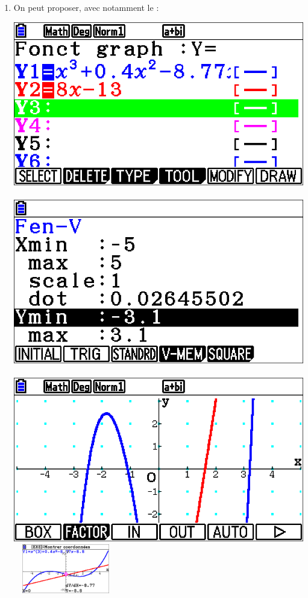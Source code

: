 \documentclass[a4paper,11pt]{article}
\begin{document}
\medskip


\begin{enumerate}
	\item On peut proposer, avec notamment le  :
	\begin{center}
		\includegraphics[height=\htimg]{tp01_corr_situ1_a}~~\includegraphics[height=\htimg]{tp01_corr_situ1_b}~~\includegraphics[height=\htimg]{tp01_corr_situ1_c}~~\includegraphics[height=2.15cm]{tp01_corr_situ1_d}

\end{center}
\end{enumerate}
\end{document}
